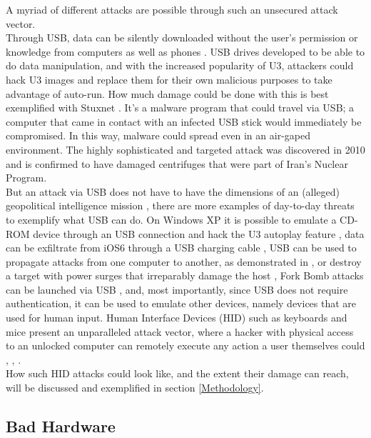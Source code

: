 A myriad of different attacks are possible through such an unsecured attack vector.\\
Through USB, data can be silently downloaded without the user's permission or knowledge from computers \cite{clarkHardwareTrojanHorse2009} as well as phones \cite{SharpIdeasDownloads2006}. USB drives developed to be able to do data manipulation, and with the increased popularity of U3, attackers could hack U3 images and replace them for their own malicious purposes to take advantage of auto-run. 
How much damage could be done with this is best exemplified with Stuxnet \cite{kushnerRealStoryStuxnet2013}. It's a malware program that could travel via USB; a computer that came in contact with an infected USB stick would immediately be compromised. In this way, malware could spread even in an air-gaped environment. The highly sophisticated and targeted attack was discovered in 2010 and is confirmed to have damaged centrifuges that were part of Iran's Nuclear Program.\\
But an attack via USB does not have to have the dimensions of an (alleged) geopolitical intelligence mission \cite{kushnerRealStoryStuxnet2013}, there are more examples of day-to-day threats to exemplify what USB can do. On Windows XP it is possible to emulate a CD-ROM device through an USB connection and hack the U3 autoplay feature \cite{al-zarouniRealityRisksConsented2006}, data can be exfiltrate from iOS6 through a USB charging cable \cite{lauMactansInjectingMalware2013}, USB can be used to propagate attacks from one computer to another, as demonstrated in \cite{wangExploitingSmartphoneUSB2010}, or destroy a target with power surges that irreparably damage the host \cite{USBKillDevices}, Fork Bomb attacks can be launched via USB \cite{efendyExploringPossibilityUSB2019}, and, most importantly, since USB does not require authentication, it can be used to emulate other devices, namely devices that are used for human input. Human Interface Devices (HID) such as keyboards and mice present an unparalleled attack vector, where a hacker with physical access to an unlocked computer can remotely execute any action a user themselves could \cite{USBRubberDucky}, \cite{MGCable2019a}, \cite{lawalFacilitatingCyberenabledFraud2022}. \\
How such HID attacks could look like, and the extent their damage can reach, will be discussed and exemplified in section \ref{Methodology}.

\subsection{Bad Hardware}

